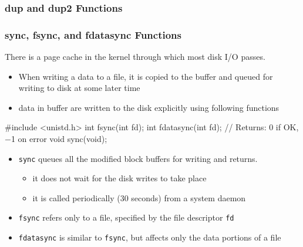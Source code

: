 \documentclass[newPxFont,sthlmFooter,nooffset]{beamer}
\begin{document}
\begin{frame}
  \frametitle{dup and dup2 Functions}
\end{frame}


\begin{frame}[containsverbatim,t]
  \frametitle{sync, fsync, and fdatasync Functions}
There is a page cache in the kernel through which most disk I/O passes.
\begin{itemize}
\item When writing a data to a file, it is copied to the buffer and queued for writing to disk at some later time
\item data in buffer are written to the disk explicitly using following functions
\end{itemize}

\begin{codedef}
#include <unistd.h> 
int fsync(int fd); 
int fdatasync(int fd);
// Returns: 0 if OK, −1 on error
void sync(void);    
\end{codedef}

\begin{itemize}
\item \texttt{sync} queues all the modified block buffers for writing and returns.
  \begin{itemize}
  \item it does not wait for the disk writes to take place
  \item it is called periodically (30 seconds) from a system daemon
  \end{itemize}
\item \texttt{fsync} refers only to a file, specified by the file descriptor \texttt{fd}
\item \texttt{fdatasync} is similar to \texttt{fsync}, but affects only the data portions of a file
\end{itemize}

\end{frame}
\end{document}

